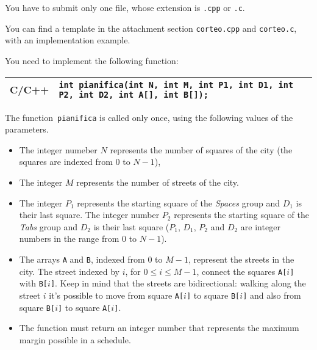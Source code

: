 \pagebreak
\Implementation

You have to submit only one file, whose extension is \texttt{.cpp} or \texttt{.c}.

\begin{warning}
You can find a template in the attachment section \texttt{corteo.cpp} and \texttt{corteo.c}, with an implementation example.
\end{warning}

You need to implement the following function:

\begin{center}\begin{tabularx}{\textwidth}{|c|X|}
\hline
\hspace*{-7pt} C/C++ \hspace*{-7pt}  & \hspace*{-6pt} \verb|int pianifica(int N, int M, int P1, int D1, int P2, int D2, int A[], int B[]);|\\
\hline
\end{tabularx}\end{center}

The function~\texttt{pianifica} is called only once, using the following values of the parameters.
\begin{itemize}[nolistsep]
  \item The integer numeber $N$ represents the number of squares of the city (the squares are indexed from $0$ to $N-1$),
  \item The integer $M$ represents the number of streets of the city.
  \item The integer $P_1$ represents the starting square of the \emph{Spaces} group and $D_1$ is their last square. The integer number $P_2$ represents the starting square of the \emph{Tabs} group and $D_2$ is their last square ($P_1$, $D_1$, $P_2$ and $D_2$ are integer numbers in the range from $0$ to $N-1$).
  \item
    The arrays \texttt{A} and \texttt{B}, indexed from $0$ to $M-1$, represent the streets in the city.
    The street indexed by $i$, for $0 \leq i \leq M-1$, connect the squares \texttt{A[$i$]} with \texttt{B[$i$]}.
    Keep in mind that the streets are bidirectional: walking along the street $i$ it's possible to move from square \texttt{A[$i$]} to square \texttt{B[$i$]} and also from square \texttt{B[$i$]} to square \texttt{A[$i$]}.
  \item The function must return an integer number that represents the maximum margin possible in a schedule.
\end{itemize}

